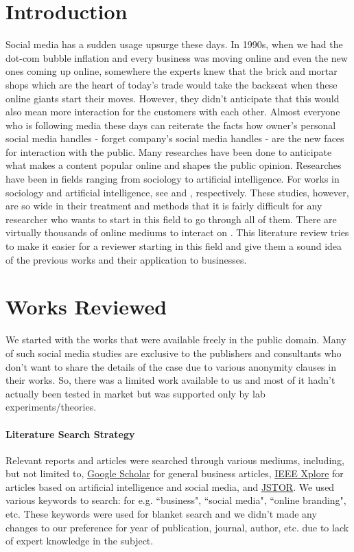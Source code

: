 \documentclass{article}
\begin{document}
\flushbottom


\section{Introduction}
Social media has a sudden usage upsurge these days. In 1990s, when we had the dot-com bubble inflation and every business was moving online and even the new ones coming up online, somewhere the experts knew that the brick and mortar shops which are the heart of today's trade would take the backseat when these online giants start their moves. However, they didn't anticipate that this would also mean more interaction for the customers with each other. Almost everyone who is following media these days can reiterate the facts how owner's personal social media handles - forget company's social media handles - are the new faces for interaction with the public. Many researches have been done to anticipate what makes a content popular online and shapes the public opinion. Researches have been in fields ranging from sociology to artificial intelligence. For works in sociology and artificial intelligence, see \cite{zeng2010} and \cite{wang2007}, respectively. These studies, however, are so wide in their treatment and methods that it is fairly difficult for any researcher who wants to start in this field to go through all of them. There are virtually thousands of online mediums to interact on \citep{harris2009}. This literature review tries to make it easier for a reviewer starting in this field and give them a sound idea of the previous works and their application to businesses.

\section{Works Reviewed}
We started with the works that were available freely in the public domain. Many of such social media studies are exclusive to the publishers and consultants who don't want to share the details of the case due to various anonymity clauses in their works. So, there was a limited work available to us and most of it hadn't actually been tested in market but was supported only by lab experiments/theories.

\paragraph{Literature Search Strategy}
Relevant reports and articles were searched through various mediums, including, but not limited to, \href{https://scholar.google.co.in/}{Google Scholar} for general business articles, \href{http://ieeexplore.ieee.org/Xplore/home.jsp}{IEEE Xplore} for articles based on artificial intelligence and social media, and \href{https://www.jstor.org/}{JSTOR}. We used various keywords to search: for e.g. ``business", ``social media", ``online branding", etc. These keywords were used for blanket search and we didn't made any changes to our preference for year of publication, journal, author, etc. due to lack of expert knowledge in the subject. 
\end{document}
